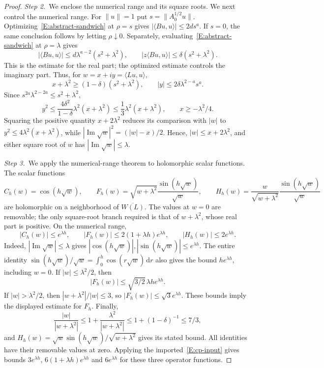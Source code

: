 \documentclass[12pt,oneside,openany]{book}
\numberwithin{equation}{section}
\theoremstyle{nogostyle}
\theoremstyle{definition}
\newcommand{\ud}{\,\mathrm{d}}
\begin{document}
\begin{proof}
  \medskip
  \noindent\textit{Step 2.~}We enclose the numerical range and its square
  roots.
  We next control the numerical range. For $\|u\| = 1$ put $s = \|A_0^{1/2}u\|$.
  Optimizing~\eqref{E:abstract-sandwich} at $\rho = s$ gives $|\langle
  Bu,u\rangle| \le 2ds^a$. If $s = 0$, the same conclusion follows by letting
  $\rho\downarrow0$. Separately, evaluating~\eqref{E:abstract-sandwich} at $\rho
  = \lambda$ gives
  \[
    |\langle Bu,u\rangle|
    \le d\lambda^{a-2}(s^2+\lambda^2),\qquad
    |z\langle Bu,u\rangle|\le\delta(s^2+\lambda^2).
  \]
  This is the estimate for the real part; the optimized estimate controls the
  imaginary part. Thus, for $w = x+iy = \langle Lu,u\rangle$,
  \[
    x+\lambda^2\ge(1-\delta)(s^2+\lambda^2),\qquad
    |y|\le2\delta\lambda^{2-a}s^a.
  \]
  Since $s^{2a}\lambda^{2-2a} \le s^2+\lambda^2$,
  \[
    y^2\le\frac{4\delta^2}{1-\delta}\lambda^2(x+\lambda^2)
    \le\frac13\lambda^2(x+\lambda^2),\qquad
    x\ge-\lambda^2/4.
  \]
  Squaring the positive quantity $x+2\lambda^2$ reduces its comparison with
  $|w|$ to $y^2\le4\lambda^2(x+\lambda^2)$, while $|\operatorname{Im}\sqrt
  w|^2=(|w|-x)/2$.
  Hence, $|w| \le x+2\lambda^2$, and either square root of $w$ has
  $|\operatorname{Im}\sqrt w| \le \lambda$.


  \medskip
  \noindent\textit{Step 3.~}We apply the numerical-range theorem to
  holomorphic scalar functions.
  The scalar functions
  \[
    C_h(w)=\cos(h\sqrt w),\qquad
    F_h(w)=\sqrt{w+\lambda^2}\frac{\sin(h\sqrt w)}{\sqrt w},\qquad
    H_h(w)=\frac{w}{\sqrt{w+\lambda^2}}
    \frac{\sin(h\sqrt w)}{\sqrt w}
  \]
  are holomorphic on a neighborhood of $\overline{W(L)}$. The values at $w = 0$
  are removable; the only square-root branch required is that of $w+\lambda^2$,
  whose real part is positive. On the numerical range,
  \[
    |C_h(w)|\le e^{\lambda h},\qquad
    |F_h(w)|\le2(1+\lambda h)e^{\lambda h},\qquad
    |H_h(w)|\le2e^{\lambda h}.
  \]
  Indeed, $|\operatorname{Im}\sqrt w| \le \lambda$ gives $|\cos(h\sqrt
  w)|,|\sin(h\sqrt w)| \le e^{\lambda h}$. The entire identity $\sin(h\sqrt
  w)/\sqrt w = \int_0^h\cos(r\sqrt w)\ud r$ also gives the bound $he^{\lambda
  h}$, including $w = 0$. If $|w| \le \lambda^2/2$, then
  \[
    |F_h(w)|\le\sqrt{3/2}\,\lambda h e^{\lambda h}.
  \]
  If $|w| > \lambda^2/2$, then $|w+\lambda^2|/|w| \le 3$, so $|F_h(w)| \le
  \sqrt3 e^{\lambda h}$. These bounds imply the displayed estimate for $F_h$.
  Finally,
  \[
    \frac{|w|}{|w+\lambda^2|}
    \le1+\frac{\lambda^2}{|w+\lambda^2|}
    \le1+(1-\delta)^{-1}\le7/3,
  \]
  and $H_h(w) = \sqrt w\sin(h\sqrt w)/\sqrt{w+\lambda^2}$ gives its stated
  bound. All identities have their removable values at zero. Applying the
  imported~\eqref{E:cp-input} gives bounds $3e^{\lambda h}$, $6(1+\lambda
  h)e^{\lambda h}$ and $6e^{\lambda h}$ for these three operator functions.



\end{proof}
\end{document}
